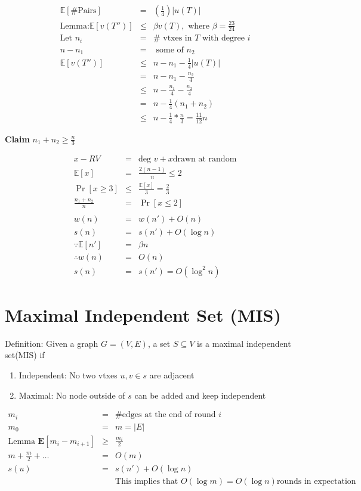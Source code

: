 \documentclass[12pt]{article}
\begin{document}
\begin{eqnarray*}
	\mathbb{E}[\# \text{Pairs}] &=&(\frac1{4})|u(T)|\\
	\text{Lemma:} \mathbb{E}[v(T'')] &\leq& \beta v(T), \text{ where } \beta = \frac{23}{24}\\
	\text{Let } n_i &=& \# \text{ vtxes in } T \text{ with degree } i\\
	n-n_1 &=& \text{ some of } n_2\\
	\mathbb{E}[v(T'')] &\leq& n-n_1-\frac1{4}|u(T)|\\
	&=& n-n_1-\frac{n_2}{4}\\
	&\leq& n-\frac{n_1}{4}-\frac{n_2}{4}\\
	&=& n-\frac1{4}(n_1+n_2)\\
	&\leq& n-\frac{1}{4}*\frac{n}{3} = \frac{11}{12}n
\end{eqnarray*}

\textbf{Claim} $n_1+n_2 \geq \frac{n}{3}$

\begin{eqnarray*}
	x-RV&=&\text{deg } v+x \text{drawn at random}\\
	\mathbb{E}[x] &=& \frac{2(n-1)}{n} \leq 2\\
	\Pr [x \geq 3] &\leq& \frac{\mathbb{E}[x]}{3} = \frac{2}{3}\\
	\frac{n_1+n_2}{n}&=&\Pr[x\leq2]\\\\
	w(n)&=&w(n')+O(n)\\
	s(n)&=&s(n')+O(\log n)\\
	\because \mathbb{E}[n'] &=& \beta n\\
	\therefore w(n)&=&O(n)\\
	s(n)&=&s(n')=O(\log^2n)
\end{eqnarray*}

\section{Maximal Independent Set (MIS)}

Definition: Given a graph $G=(V,E)$, a set $S\subseteq V$ is a maximal independent set(MIS) if
\begin{enumerate}
	\item Independent: No two vtxes $u,v \in s$ are adjacent
	\item Maximal: No node outside of $s$ can be added and keep independent
\end{enumerate}

\begin{eqnarray*}
m_i &=& \# \text{edges at the end of round } i\\
m_0&=&m=|E|\\
\text{Lemma } \mathbf{E}[m_i-m_{i+1}] &\geq& \frac{m_i}{2}\\
m+\frac{m}{2}+\dots &=& O(m)\\
s(u) &=& s(n')+O(\log n)\\
&&\text{This implies that } O(\log m) = O(\log n) \text{rounds in expectation}
\end{eqnarray*}
\end{document}
